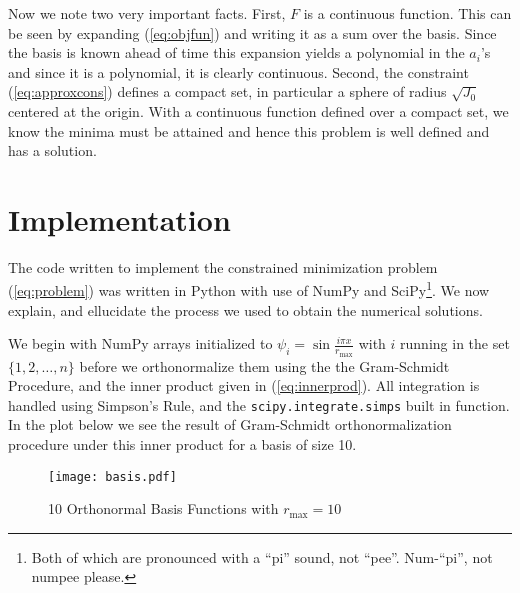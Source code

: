 Now we note two very important facts. First, \(F\) is a continuous function.
This can be seen by expanding (\ref{eq:objfun}) and writing it as a sum over the
basis. Since the basis is known ahead of time this expansion yields a polynomial
in the \(a_i\)'s and since it is a polynomial, it is clearly continuous. Second,
the constraint (\ref{eq:approxcons}) defines a compact set, in particular a
sphere of radius \(\sqrt{J_0}\) centered at the origin. With a continuous
function defined over a compact set, we know the minima must be attained and
hence this problem is well defined and has a solution.


\section{Implementation}\label{sec:imp}
The code written to implement the constrained minimization problem
(\ref{eq:problem}) was written in Python with use of NumPy and
SciPy\footnote{Both of which are pronounced with a ``pi'' sound, not ``pee''.
    Num-``pi'', not numpee please.}. We now explain, and ellucidate the process we
used to obtain the numerical solutions.

We begin with NumPy arrays initialized to
\(\psi_i = \sin{\frac{i\pi x}{r_\text{max}}}\) with \(i\) running in the set
\(\{1,2,\ldots, n\}\) before we orthonormalize them using the  the Gram-Schmidt
Procedure, and the inner product given in (\ref{eq:innerprod}). All integration
is handled using Simpson's Rule, and the \texttt{scipy.integrate.simps} built in
function. In the plot below we see the result of Gram-Schmidt orthonormalization
procedure under this inner product for a basis of size 10.
\begin{figure}[H]
    \centering
    \texttt{[image: basis.pdf]}
    \caption{10 Orthonormal Basis Functions with \(r_\text{max} = 10\)}\label{fig:basis}
\end{figure}

